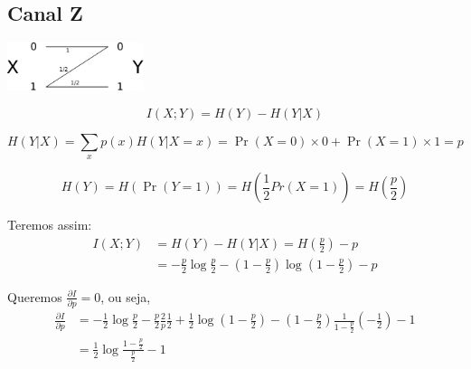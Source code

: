 \subsection{Canal Z}

\begin{questions}

\begin{solution}

\begin{center}
\includegraphics[width=0.3\textwidth]{../images/zchannel.pdf}
\end{center}

\begin{equation}
I(X;Y) = H(Y) - H(Y|X)
\end{equation}

\begin{equation}
H(Y|X) = \sum_x p(x) H(Y|X=x) = \Pr(X=0) \times 0 + \Pr(X=1) \times 1 = p
\end{equation}

\begin{equation}
H(Y) = H\left( \Pr(Y=1) \right) = H\left( \frac{1}{2} Pr(X=1) \right) = H\left(\frac{p}{2}\right)
\end{equation}

Teremos assim:
\begin{align}
I(X;Y) &= H(Y) - H(Y|X) = H\left(\frac{p}{2}\right) - p \nonumber \\
       &= - \frac{p}{2} \log \frac{p}{2} - \left(1 - \frac{p}{2}\right) \log \left(1 - \frac{p}{2}\right) - p 
\end{align}

Queremos $\frac{\partial I}{\partial p} = 0$, ou seja,
\begin{align}
\frac{\partial I}{\partial p} 
        &= - \frac{1}{2} \log \frac{p}{2} - \frac{p}{2} \frac{2}{p} \frac{1}{2} + \frac{1}{2} \log \left( 1 - \frac{p}{2} \right) - \left( 1- \frac{p}{2} \right) \frac{1}{1 - \frac{p}{2}} \left(-\frac{1}{2}\right) - 1 \nonumber \\
        &= \frac{1}{2} \log \frac{1 - \frac{p}{2}}{\frac{p}{2}} - 1
\end{align}


\end{solution}
\end{questions}

